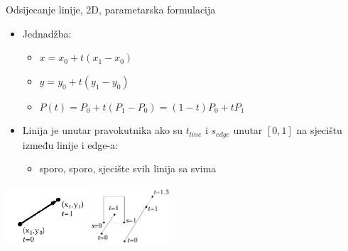\documentclass[9pt]{beamer}
\begin{document}
\begin{frame}{Odsijecanje linije, 2D, parametarska formulacija}
	\begin{itemize}
		\item Jednadžba:
		\begin{itemize}
			\item $x = x_{0}+t(x_{1}-x_{0})$
			\item $y = y_{0}+t(y_{1}-y_{0})$
			\item $P(t) = P_{0}+t(P_{1}-P_{0})=(1-t)P_{0}+tP_{1}$
		\end{itemize}
		\item Linija je unutar pravokutnika ako su $t_{line}$ i $s_{edge}$ unutar $[0,1]$ na sjecištu
		između linije i edge-a:
		\begin{itemize}
			\item sporo, sporo, sjecište svih linija sa svima
		\end{itemize}
	\end{itemize}
	\begin{center}
		\includegraphics[width=3cm]{slike/parametric.png}
		\includegraphics[width=3cm]{slike/parametric_2.png}
	\end{center}
\end{frame}
\end{document}
